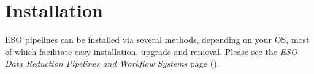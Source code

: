 \section{Installation}
\label{sec:installation}
\label{sec:install-howto}


ESO pipelines can be installed via several methods, depending on your OS, most
of which facilitate easy installation, upgrade and removal. Please see the
\textit{ESO Data Reduction Pipelines and Workflow Systems} page
().





